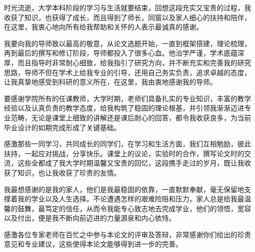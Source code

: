 
\begin{acknowledgements}

时光流逝，大学本科阶段的学习与生活就要结束，回想这段充实又宝贵的过程，我收获了知识，也获得了成长，而且得到了师长，同窗以及家人细心的扶持和陪伴，在这里，我衷心地向所有给我帮助和关怀的人表示最诚真的感谢。

我要向我的导师致以最高的敬意，从论文选题开始，一直到框架搭建，理论梳理，再到最后的撰写和修订阶段，导师都投入了很多心血。他治学严谨，学术底蕴深厚，而且指导时非常耐心细致，给我指引了研究方向，并不断充实和完善我的研究思路，导师不但在学术上给我专业的引导，还用自己务实负责，追求卓越的态度，让我真挚地感受到科研的意义所在，在这里，我由衷地感谢我的导师。

要感谢学院所有的任课教师，大学时期，老师们具备扎实的专业知识，丰富的教学经验以及认真负责的教学态度，给我构筑了稳固的理论根基，并引领我渐渐迈进专业范畴，无论是课堂上细致的讲解还是课后耐心的回答，都令我收获良多，为当前毕业设计的如期完成形成了关键基础。

感激那些一同学习，共同成长的同学们，在学习和生活方面，我们互相勉励，彼此扶持，一起应对挑战，分享快乐。课堂上的议论，实验时的合作，撰写论文时的交流，这些全都成了我大学时期温馨又宝贵的回忆，这段携手走过的岁月，既让我收获了知识，也让我收获了珍贵的友情。

我最想感谢的是我的家人，他们是我最稳固的依靠，一直默默奉献，毫无保留地支撑着我的学业以及人生选择。不论遭遇怎样的艰难险阻和压力，家人总是给我最温馨的鼓舞，最笃定的信任，从而令我能专心致志地去完成学业，他们的领悟，宽容以及付出，便是我不断向前迈进的力量源泉和内心依恃。

感激各位专家老师在百忙之中参与本论文的评审及答辩，非常感谢你们给出的珍贵意见和专业建议，这些使得本论文能够得到进一步的完善。

\end{acknowledgements}
